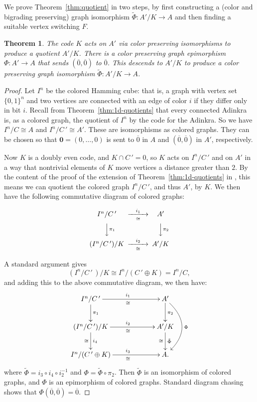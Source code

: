 \documentclass[12pt,twoside,singlespace]{article}
\numberwithin{equation}{section}
\newtheorem{thm}[equation]{Theorem}
\theoremstyle{definition}
\renewcommand{\vec}[1]{\mathbf{#1}}
\begin{document}
We prove Theorem~\ref{thm:quotient} in two steps, by first constructing a (color and bigrading preserving) graph isomorphism $\tilde{\Phi}:A'/K\to A$ and then finding a suitable vertex switching $F$.

\begin{thm}
\label{thm:isocolors}
The code $K$ acts on $A'$ via color preserving isomorphisms to produce a quotient $A'/K$.  There is a color preserving graph epimorphism $\Phi:A' \to A$ that sends $(\overline{0},\overline{0})$ to $\overline{0}$.  This descends to $A'/K$ to produce a color preserving graph isomorphism $\tilde{\Phi}:A'/K\to A$.
\end{thm}
\begin{proof}
Let $I^n$ be the colored Hamming cube: that is, a graph with vertex set $\{0,1\}^n$ and two vertices are connected with an edge of color $i$ if they differ only in bit $i$.  Recall from Theorem~\ref{thm:1d-quotients} that every connected Adinkra is, as a colored graph, the quotient of $I^n$ by the code for the Adinkra.  So we have $I^n/C \cong A$ and $I^n/C\,'\cong A'$. These are isomorphisms as colored graphs.  They can be chosen so that $\vec{0}=(0,\ldots,0)$ is sent to $\overline{0}$ in $A$ and $(\overline{0},\overline{0})$ in $A'$, respectively.

Now $K$ is a doubly even code, and $K\cap C\,'=0$, so $K$ acts on $I^n/C\,'$ and on $A'$ in a way that nontrivial elements of $K$ move vertices a distance greater than $2$. By the content of the proof of the extension of Theorem~\ref{thm:1d-quotients} in \cite{zhang:adinkras}, this means we can quotient the colored graph $I^n/C\,'$, and thus $A'$, by $K$.  We then have the following commutative diagram of colored graphs:

\[
\begin{CD}
I^n/C\,' @>i_1>\cong> A'\\
@VV\pi_1 V @VV\pi_2 V\\
(I^n/C\,')/K @>i_2>\cong> A'/K\\
\end{CD}  
\]

A standard argument gives
\[(I^n/C\,'\,)/K \cong I^n/(C\,'\oplus K)=I^n/C,\]
and adding this to the above commutative diagram, we then have:
\[
\xymatrixcolsep{5pc}
\xymatrix{
I^n/C\,' \ar[d]^{\pi_1} \ar[r]^{i_1}_{\cong} &A'\ar[d]^{\pi_2}\ar@/^2pc/[dd]^{\Phi} \\
(I^n/C\,')/K \ar[d]^{i_4}_{\cong} \ar[r]^{i_2}_\cong &A'/K\ar[d]_{\cong}^{\tilde{\Phi}}\\
I^n/(C\,'\oplus K) \ar[r]^{i_3}_\cong &A.}
\]
where $\tilde{\Phi}=i_3\circ i_4\circ i_2^{-1}$ and $\Phi=\tilde{\Phi}\circ \pi_2$.  Then $\tilde{\Phi}$ is an isomorphism of colored graphs, and $\Phi$ is an epimorphism of colored graphs.  Standard diagram chasing shows that $\Phi(\overline{0},\overline{0})=\overline{0}$.
\end{proof}
\end{document}
